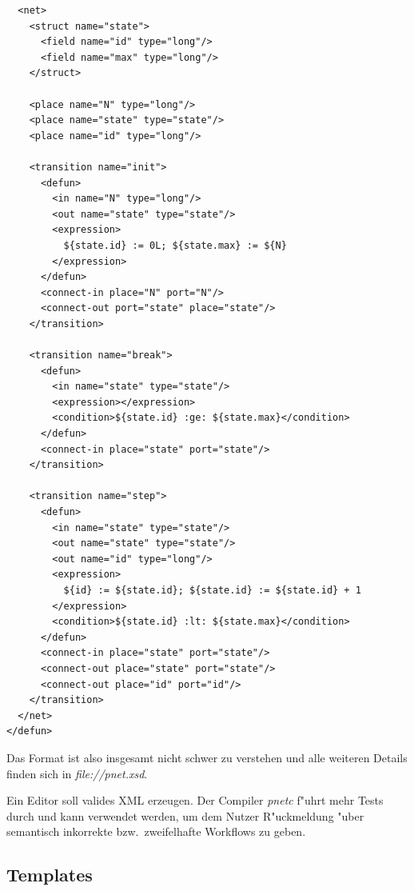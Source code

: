 \documentclass[a4paper,12pt]{article}
\newlength{\st}\setlength{\st}{0pt}
\newcommand{\program}[1]{\textit{#1}}
\newcommand{\file}[1]{\textsl{file://#1}}
\begin{document}
\begin{itemize}
\begin{verbatim}
  <net>
    <struct name="state">
      <field name="id" type="long"/>
      <field name="max" type="long"/>
    </struct>

    <place name="N" type="long"/>
    <place name="state" type="state"/>
    <place name="id" type="long"/>

    <transition name="init">
      <defun>
        <in name="N" type="long"/>
        <out name="state" type="state"/>
        <expression>
          ${state.id} := 0L; ${state.max} := ${N}
        </expression>
      </defun>
      <connect-in place="N" port="N"/>
      <connect-out port="state" place="state"/>
    </transition>

    <transition name="break">
      <defun>
        <in name="state" type="state"/>
        <expression></expression>
        <condition>${state.id} :ge: ${state.max}</condition>
      </defun>
      <connect-in place="state" port="state"/>
    </transition>

    <transition name="step">
      <defun>
        <in name="state" type="state"/>
        <out name="state" type="state"/>
        <out name="id" type="long"/>
        <expression>
          ${id} := ${state.id}; ${state.id} := ${state.id} + 1
        </expression>
        <condition>${state.id} :lt: ${state.max}</condition>
      </defun>
      <connect-in place="state" port="state"/>
      <connect-out place="state" port="state"/>
      <connect-out place="id" port="id"/>
    </transition>
  </net>
</defun>
\end{verbatim}
\end{itemize}

Das Format ist also insgesamt nicht schwer zu verstehen und alle
weiteren Details finden sich in \file{pnet.xsd}.

Ein Editor soll valides XML erzeugen. Der Compiler \program{pnetc}
f"uhrt mehr Tests durch und kann verwendet werden, um dem Nutzer
R"uckmeldung "uber semantisch inkorrekte bzw.\ zweifelhafte Workflows
zu geben.

\subsection{Templates}
\end{document}
